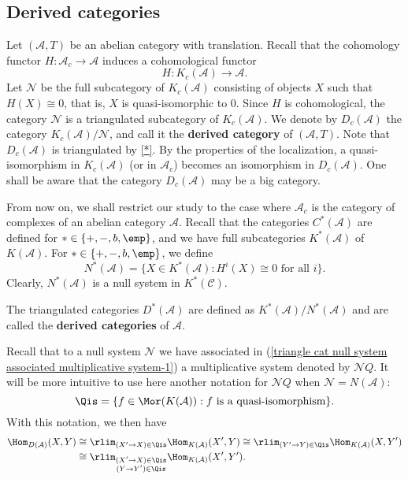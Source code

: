 \subsection{Derived categories}
Let $(\mathcal{A},T)$ be an abelian category with translation. Recall that the cohomology functor $H:\mathcal{A}_c\to\mathcal{A}$ induces a cohomological functor
\[H:K_c(\mathcal{A})\to\mathcal{A}.\]
Let $\mathcal{N}$ be the full subcategory of $K_c(\mathcal{A})$ consisting of objects $X$ such that $H(X)\cong 0$, that is, $X$ is quasi-isomorphic to $0$. Since $H$ is cohomological, the category $\mathcal{N}$ is a triangulated subcategory of $K_c(\mathcal{A})$. We denote by $D_c(\mathcal{A})$ the category $K_c(\mathcal{A})/\mathcal{N}$, and call it the \textbf{derived category} of $(\mathcal{A},T)$. Note that $D_c(\mathcal{A})$ is triangulated by \cref{*}. By the properties of the localization, a quasi-isomorphism in $K_c(\mathcal{A})$ (or in $\mathcal{A}_c$) becomes an isomorphism in $D_c(\mathcal{A})$. One shall be aware that the category $D_c(\mathcal{A})$ may be a big category.\par
From now on, we shall restrict our study to the case where $\mathcal{A}_c$ is the category of complexes of an abelian category $\mathcal{A}$. Recall that the categories $C^*(\mathcal{A})$ are defined for $\ast\in\{+,-,b,\emp\}$, and we have full subcategories $K^*(\mathcal{A})$ of $K(\mathcal{A})$. For $\ast\in\{+,-,b,\emp\}$, we define
\[N^*(\mathcal{A})=\{X\in K^*(\mathcal{A}):\text{$H^i(X)\cong 0$ for all $i$}\}.\]
Clearly, $N^*(\mathcal{A})$ is a null system in $K^*(\mathcal{C})$.

\begin{definition}
The triangulated categories $D^*(\mathcal{A})$ are defined as $K^*(\mathcal{A})/N^*(\mathcal{A})$ and are called the \textbf{derived categories} of $\mathcal{A}$.
\end{definition}

Recall that to a null system $\mathcal{N}$ we have associated in (\ref{triangle cat null system associated multiplicative system-1}) a multiplicative system denoted by $\mathcal{N}Q$. It will be more intuitive to use here another notation for $\mathcal{N}Q$ when $\mathcal{N}=N(\mathcal{A})$:
\[\Qis=\{f\in\Mor(K(\mathcal{A})):\text{$f$ is a quasi-isomorphism}\}.\]
With this notation, we then have
\begin{align*}
\Hom_{D(\mathcal{A})}(X,Y)&\cong \rlim_{(X'\to X)\in\Qis}\Hom_{K(\mathcal{A})}(X',Y)\cong \rlim_{(Y'\to Y)\in\Qis}\Hom_{K(\mathcal{A})}(X,Y')\\&\cong \rlim_{\substack{(X'\to X)\in\Qis\\(Y\to Y')\in\Qis}}\Hom_{K(\mathcal{A})}(X',Y').
\end{align*}

